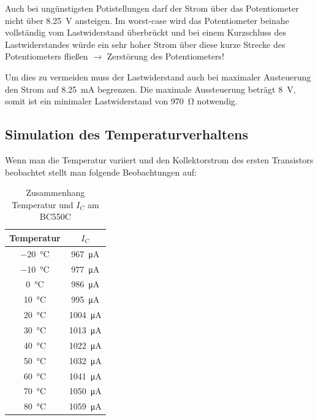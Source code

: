 Auch bei ungünstigsten Potistellungen darf der Strom über das Potentiometer nicht über \SI{8.25}{\volt} ansteigen.
Im worst-case wird das Potentiometer beinahe vollständig vom Lastwiderstand überbrückt und bei einem Kurzschluss des Lastwiderstandes würde ein sehr hoher Strom über diese kurze Strecke des Potentiometers fließen $\rightarrow$ Zerstörung des Potentiometers!

Um dies zu vermeiden muss der Lastwiderstand auch bei maximaler Austeuerung den Strom auf \SI{8.25}{\milli \ampere} begrenzen. Die maximale Aussteuerung beträgt \SI{8}{\volt}, somit ist ein minimaler Lastwiderstand von \SI{970}{\ohm} notwendig.

\subsection{Simulation des Temperaturverhaltens}

Wenn man die Temperatur variiert und den Kollektorstrom des ersten Transistors beobachtet stellt man folgende Beobachtungen auf:

\begin{table}[H]
    \centering
    \begin{tabular}{|c|c|}
    \hline
         Temperatur & $I_{C}$  \\ \hline \hline
         \SI{-20}{\celsius}& \SI{967}{\micro \ampere} \\ \hline
         \SI{-10}{\celsius}& \SI{977}{\micro \ampere} \\ \hline
         \SI{0}{\celsius}& \SI{986}{\micro \ampere} \\ \hline
         \SI{10}{\celsius}& \SI{995}{\micro \ampere} \\ \hline
         \SI{20}{\celsius}& \SI{1004}{\micro \ampere} \\ \hline
         \SI{30}{\celsius}& \SI{1013}{\micro \ampere} \\ \hline
         \SI{40}{\celsius}& \SI{1022}{\micro \ampere} \\ \hline
         \SI{50}{\celsius}& \SI{1032}{\micro \ampere} \\ \hline
         \SI{60}{\celsius}& \SI{1041}{\micro \ampere} \\ \hline
         \SI{70}{\celsius}& \SI{1050}{\micro \ampere} \\ \hline
         \SI{80}{\celsius}& \SI{1059}{\micro \ampere} \\ \hline
    \end{tabular}
    \caption{Zusammenhang Temperatur und $I_{C}$ am BC550C}
    \label{tab:my_label}
\end{table}

